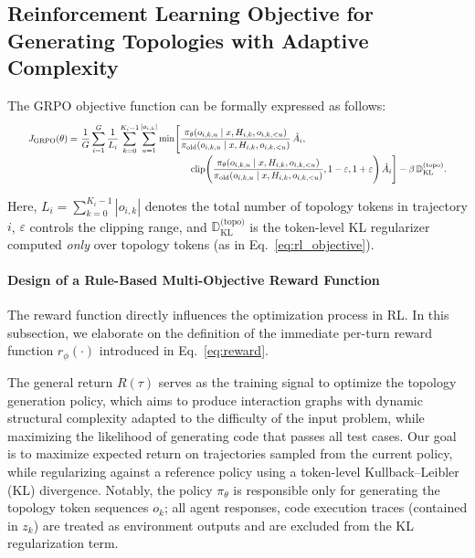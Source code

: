 \documentclass{article}
\theoremstyle{definition}
\begin{document}
\subsection{Reinforcement Learning Objective for Generating Topologies with Adaptive Complexity}  
\label{appendix:rl_funs}
The GRPO objective function can be formally expressed as follows:
\begin{equation}\label{eq:grpo_obj_fit}
\resizebox{0.95\linewidth}{!}{$
\begin{aligned}
J_{\mathrm{GRPO}}(\theta)=&\ \frac{1}{G}\sum_{i=1}^{G}\frac{1}{L_i}
\sum_{k=0}^{K_i-1}\sum_{u=1}^{|o_{i,k}|}
\min\!\Bigg[
\frac{\pi_\theta\!\left(o_{i,k,u}\mid x,H_{i,k},o_{i,k,<u}\right)}
     {\pi_{\text{old}}\!\left(o_{i,k,u}\mid x,H_{i,k},o_{i,k,<u}\right)}\,\hat A_i,\ 
\\[-2pt]
&\hspace{4.2cm}
\operatorname{clip}\!\Bigg(
\frac{\pi_\theta\!\left(o_{i,k,u}\mid x,H_{i,k},o_{i,k,<u}\right)}
     {\pi_{\text{old}}\!\left(o_{i,k,u}\mid x,H_{i,k},o_{i,k,<u}\right)},
1-\varepsilon,1+\varepsilon\Bigg)\,\hat A_i
\Bigg] 
-\beta\,\mathbb D_{\mathrm{KL}}^{\text{(topo)}}.
\end{aligned}
$}
\end{equation}

Here, $L_i=\sum_{k=0}^{K_i-1}|o_{i,k}|$ denotes the total number of topology tokens in trajectory $i$, $\varepsilon$ controls the clipping range, and $\mathbb D_{\mathrm{KL}}^{\text{(topo)}}$ is the token-level KL regularizer computed \emph{only} over topology tokens (as in Eq.~\ref{eq:rl_objective}). 
\paragraph{Design of a Rule-Based Multi-Objective Reward Function}
The reward function directly influences the optimization process in RL. 
In this subsection, we elaborate on the definition of the immediate per-turn reward function 
\(r_\phi(\cdot)\) introduced in Eq.~\ref{eq:reward}. 

The general return $R(\tau)$ serves as the training signal to optimize the topology generation policy, which aims to produce interaction graphs with dynamic structural complexity adapted to the difficulty of the input problem, while maximizing the likelihood of generating code that passes all test cases. Our goal is to maximize expected return on trajectories sampled from the current policy, while regularizing against a reference policy using a token-level Kullback–Leibler (KL) divergence. Notably, the policy $\pi_\theta$ is responsible only for generating the topology token sequences $o_k$; all agent responses, code execution traces (contained in $z_k$) are treated as environment outputs and are excluded from the KL regularization term.
\end{document}
